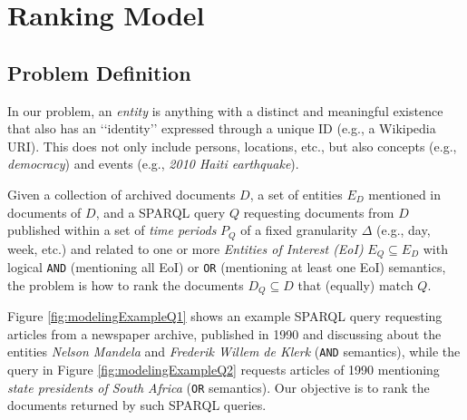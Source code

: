 \documentclass{libtex/sig-alternate-05-2015}
\newcommand{\q}[1]{\lq\lq{}{}#1\rq\rq{}{}}
\begin{document}
\section{Ranking Model}

\subsection{Problem Definition}

In our problem, an {\em entity} is anything with a distinct and meaningful existence
that also has an \q{identity} expressed through a unique ID (e.g., a Wikipedia URI).
This does not only include persons, locations, etc., but also
concepts (e.g., {\em democracy}) and
events (e.g., {\em 2010 Haiti earthquake}).

Given a collection of archived documents $D$,
a set of entities $E_D$ mentioned in documents of $D$,
and a SPARQL query $Q$ requesting documents from $D$
published within a set of {\em time periods} $P_Q$ of a fixed granularity $\Delta$ (e.g., day, week, etc.)
and related to one or more {\em Entities of Interest (EoI)} $E_Q \subseteq E_D$
with logical {\tt AND} (mentioning all EoI) or {\tt OR} (mentioning at least one EoI) semantics,
the problem is how to rank the documents $D_Q \subseteq D$ that (equally) match $Q$.

Figure \ref{fig:modelingExampleQ1} shows an example SPARQL query
requesting articles from a newspaper archive, published in 1990
and discussing about the entities {\em Nelson Mandela}
and {\em Frederik Willem de Klerk}
({\tt AND} semantics),
while the query in Figure \ref{fig:modelingExampleQ2} requests
articles of 1990 mentioning {\em state presidents of South Africa}
({\tt OR} semantics).
Our objective is to rank the documents returned by
such SPARQL queries.
\end{document}
